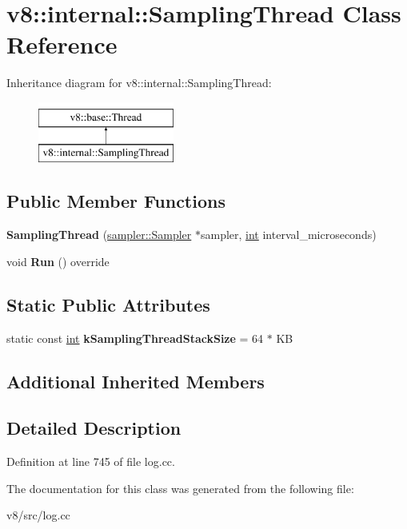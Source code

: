 \hypertarget{classv8_1_1internal_1_1SamplingThread}{}\section{v8\+:\+:internal\+:\+:Sampling\+Thread Class Reference}
\label{classv8_1_1internal_1_1SamplingThread}
Inheritance diagram for v8\+:\+:internal\+:\+:Sampling\+Thread\+:\begin{figure}[H]
\begin{center}
\leavevmode
\includegraphics[height=2.000000cm]{classv8_1_1internal_1_1SamplingThread}
\end{center}
\end{figure}
\subsection*{Public Member Functions}
\begin{DoxyCompactItemize}
\item 
\mbox{\label{classv8_1_1internal_1_1SamplingThread_a3f9cb6ed18ecf29ef8f3c6106440f8a6}} 
{\bfseries Sampling\+Thread} (\mbox{\hyperlink{classv8_1_1sampler_1_1Sampler}{sampler\+::\+Sampler}} $\ast$sampler, \mbox{\hyperlink{classint}{int}} interval\+\_\+microseconds)
\item 
\mbox{\label{classv8_1_1internal_1_1SamplingThread_a30bada5a66c6bf06bf3a29b500d88de1}} 
void {\bfseries Run} () override
\end{DoxyCompactItemize}
\subsection*{Static Public Attributes}
\begin{DoxyCompactItemize}
\item 
\mbox{\label{classv8_1_1internal_1_1SamplingThread_a019d60e5a0d006f99b2b26511bd132d4}} 
static const \mbox{\hyperlink{classint}{int}} {\bfseries k\+Sampling\+Thread\+Stack\+Size} = 64 $\ast$ KB
\end{DoxyCompactItemize}
\subsection*{Additional Inherited Members}


\subsection{Detailed Description}


Definition at line 745 of file log.\+cc.



The documentation for this class was generated from the following file\+:\begin{DoxyCompactItemize}
\item 
v8/src/log.\+cc\end{DoxyCompactItemize}

